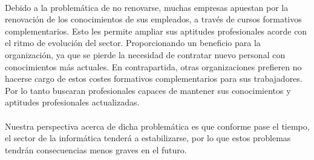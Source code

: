 \documentclass[12pt, a4paper]{report}
\begin{document}
        \paragraph{}
        Debido a la problemática de no renovarse, muchas empresas apuestan por la renovación de los conocimientos de sus empleados, a través de cursos formativos complementarios. Esto les permite ampliar sus aptitudes profesionales acorde con el ritmo de evolución del sector. Proporcionando un beneficio para la organización, ya que se pierde la necesidad de contratar nuevo personal con conocimientos más actuales. En contrapartida, otras organizaciones prefieren no hacerse cargo de estos costes formativos complementarios para sus trabajadores. Por lo tanto buscaran profesionales capaces de mantener sus conocimientos y aptitudes profesionales actualizadas.
        
        \paragraph{}
       	Nuestra perspectiva acerca de dicha problemática es que conforme pase el tiempo, el sector de la informática tenderá a estabilizarse, por lo que estos problemas tendrán consecuencias menos graves en el futuro.
        
\end{document}
